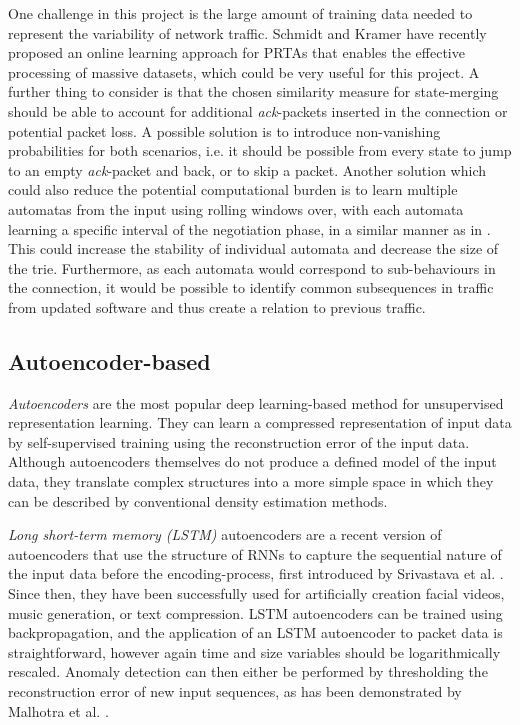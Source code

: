 \documentclass[a4paper,12pt,twoside]{report}
\begin{document}
One challenge in this project is the large amount of training data needed to represent the variability of network traffic. Schmidt and Kramer \cite{schmidt2014online} have recently proposed an online learning approach for PRTAs that enables the effective processing of massive datasets, which could be very useful for this project. A further thing to consider is that the chosen similarity measure for state-merging should be able to account for additional \textit{ack}-packets inserted in the connection or potential packet loss. A possible solution is to introduce non-vanishing probabilities for both scenarios, i.e. it should be possible from every state to jump to an empty \textit{ack}-packet and back, or to skip a packet. Another solution which could also reduce the potential computational burden is to learn multiple automatas from the input using rolling windows over, with each automata learning a specific interval of the negotiation phase, in a similar manner as in \cite{pellegrino2017learning}. This could increase the stability of individual automata and decrease the size of the trie. Furthermore, as each automata would correspond to sub-behaviours in the connection, it would be possible to identify common subsequences in traffic from updated software and thus create a relation to previous traffic. 

\subsection{Autoencoder-based}\label{AUTOBASED}

\textit{Autoencoders} are the most popular deep learning-based method for unsupervised representation learning. They can learn a compressed representation of input data by self-supervised training using the reconstruction error of the input data. Although autoencoders themselves do not produce a defined model of the input data, they translate complex structures into a more simple space in which they can be described by conventional density estimation methods. 

\textit{Long short-term memory (LSTM)} autoencoders are a recent version of autoencoders that use the structure of RNNs to capture the sequential nature of the input data before the encoding-process, first introduced by Srivastava et al. \cite{srivastava2015unsupervised}. Since then, they have been successfully used for artificially creation facial videos, music generation, or text compression.
LSTM autoencoders can be trained using backpropagation, and the application of an LSTM autoencoder to packet data is straightforward, however again time and size variables should be logarithmically rescaled. Anomaly detection can then either be performed by thresholding the reconstruction error of new input sequences, as has been demonstrated by Malhotra et al. \cite{malhotra2016lstm}.
 
\end{document}
